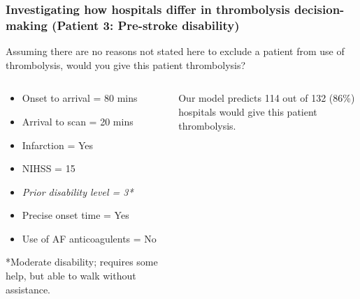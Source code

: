 \documentclass[xcolor={usenames,dvipsnames}]{beamer}
\begin{document}
\begin{frame}
\frametitle{Investigating how hospitals differ in thrombolysis decision-making (Patient 3: Pre-stroke disability)}

Assuming there are no reasons not stated here to exclude a patient from use of thrombolysis, would you give this patient thrombolysis?

\vspace{3mm}

\begin{columns}
    \begin{column}{0.5\textwidth}
        \begin{itemize}
            \item Onset to arrival = 80 mins
            \item Arrival to scan = 20 mins
            \item Infarction = Yes
            \item NIHSS = 15
            \item \emph{Prior disability level = 3*}
            \item Precise onset time = Yes
            \item Use of AF anticoagulents = No
        \end{itemize}
    \vspace{3mm}    
    \footnotesize{*Moderate disability; requires some help, but able to walk without assistance.}
    \end{column}
    
    \begin{column}{0.4\textwidth}
    Our model predicts 114 out of 132 (86\%) hospitals would give this patient thrombolysis.
    \end{column}

\end{columns}
\end{frame}

\end{document}
